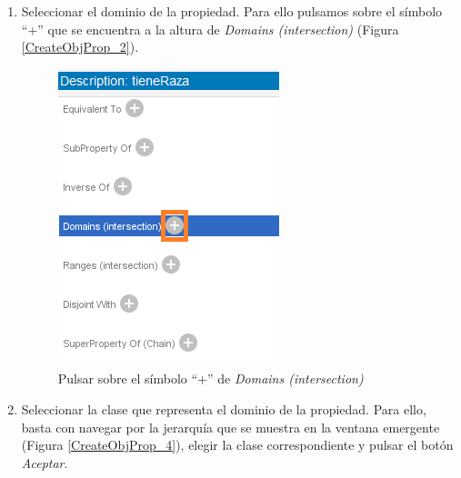 \begin{enumerate}
    \item Seleccionar el dominio de la propiedad. Para ello pulsamos sobre el símbolo “+” que se encuentra a la altura de 
    \textit{Domains (intersection)} (Figura \ref*{CreateObjProp_2}).
    \begin{figure}[ht]
        \centering
        \includegraphics[scale=0.6]{Figures/Protege/CreateObjProp_3.png}
        \caption{Pulsar sobre el símbolo “+” de \textit{Domains (intersection)}}
        \label{CreateObjProp_3}
    \end{figure}

    \item Seleccionar la clase que representa el dominio de la propiedad. Para ello, basta con navegar por la 
    jerarquía que se muestra en la ventana emergente (Figura \ref*{CreateObjProp_4}), elegir la clase correspondiente 
    y pulsar el botón \textit{Aceptar}.


\end{enumerate}
